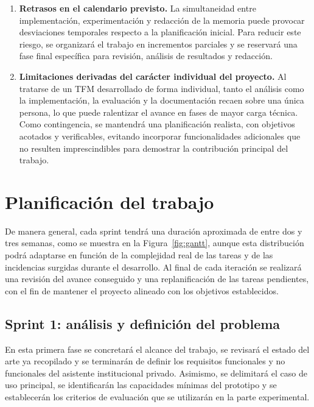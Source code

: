 \begin{enumerate}
    \item \textbf{Retrasos en el calendario previsto.}  
    La simultaneidad entre implementación, experimentación y redacción de la memoria puede provocar desviaciones temporales respecto a la planificación inicial.  
    Para reducir este riesgo, se organizará el trabajo en incrementos parciales y se reservará una fase final específica para revisión, análisis de resultados y redacción. 

    \item \textbf{Limitaciones derivadas del carácter individual del proyecto.}  
    Al tratarse de un TFM desarrollado de forma individual, tanto el análisis como la implementación, la evaluación y la documentación recaen sobre una única persona, lo que puede ralentizar el avance en fases de mayor carga técnica.  
    Como contingencia, se mantendrá una planificación realista, con objetivos acotados y verificables, evitando incorporar funcionalidades adicionales que no resulten imprescindibles para demostrar la contribución principal del trabajo.
\end{enumerate}


\section{Planificación del trabajo}\label{sec:planificacion}

De manera general, cada sprint tendrá una duración aproximada de entre dos y tres semanas, como se muestra en la Figura~\ref{fig:gantt}, aunque esta distribución podrá adaptarse en función de la complejidad real de las tareas y de las incidencias surgidas durante el desarrollo. 
Al final de cada iteración se realizará una revisión del avance conseguido y una replanificación de las tareas pendientes, con el fin de mantener el proyecto alineado con los objetivos establecidos.

\subsection{Sprint 1: análisis y definición del problema}

En esta primera fase se concretará el alcance del trabajo, se revisará el estado del arte ya recopilado y se terminarán de definir los requisitos funcionales y no funcionales del asistente institucional privado. 
Asimismo, se delimitará el caso de uso principal, se identificarán las capacidades mínimas del prototipo y se establecerán los criterios de evaluación que se utilizarán en la parte experimental.

